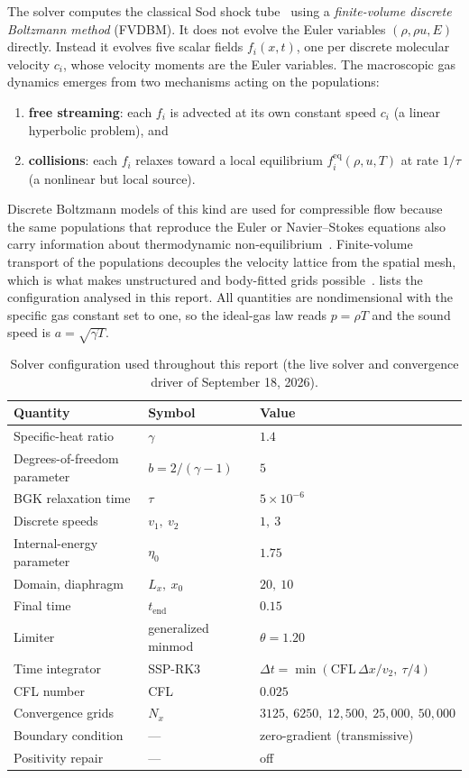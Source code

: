 \documentclass[11pt]{article}
\theoremstyle{remark}
\newcommand{\feq}{f^{\mathrm{eq}}}
\begin{document}
The solver computes the classical Sod shock tube~\citep{Sod1978} using a
\emph{finite-volume discrete Boltzmann method} (FVDBM).  It does not evolve the Euler
variables $(\rho,\rho u,E)$ directly.  Instead it evolves five scalar fields
$f_i(x,t)$, one per discrete molecular velocity $c_i$, whose velocity moments are
the Euler variables.  The macroscopic gas dynamics emerges from two mechanisms
acting on the populations:
\begin{enumerate}
  \item \textbf{free streaming}: each $f_i$ is advected at its own constant speed
        $c_i$ (a linear hyperbolic problem), and
  \item \textbf{collisions}: each $f_i$ relaxes toward a local equilibrium
        $\feq_i(\rho,u,T)$ at rate $1/\tau$ (a nonlinear but local source).
\end{enumerate}
Discrete Boltzmann models of this kind are used for compressible flow because the
same populations that reproduce the Euler or Navier--Stokes equations also carry
information about thermodynamic non-equilibrium~\citep{XuZhangZhang2018,Gan2018}.
Finite-volume transport of the populations decouples the velocity lattice from the
spatial mesh, which is what makes unstructured and body-fitted grids
possible~\citep{XuChenCai2021}.
 lists the configuration analysed in this report.
All quantities are nondimensional with the specific gas constant set to one, so
the ideal-gas law reads $p=\rho T$ and the sound speed is $a=\sqrt{\gamma T}$.

\begin{table}[ht]
\centering
\caption{Solver configuration used throughout this report (the live solver and
convergence driver of September 18, 2026).}
\label{tab:config}
\small
\begin{tabular}{@{}lll@{}}
\toprule
Quantity & Symbol & Value \\
\midrule
Specific-heat ratio & $\gamma$ & $1.4$ \\
Degrees-of-freedom parameter & $b = 2/(\gamma-1)$ & $5$ \\
BGK relaxation time & $\tau$ & $5\times10^{-6}$ \\
Discrete speeds & $v_1,\ v_2$ & $1,\ 3$ \\
Internal-energy parameter & $\eta_0$ & $1.75$ \\
Domain, diaphragm & $L_x,\ x_0$ & $20,\ 10$ \\
Final time & $t_{\mathrm{end}}$ & $0.15$ \\
Limiter & generalized minmod & $\theta = 1.20$ \\
Time integrator & SSP-RK3 & $\Delta t=\min(\mathrm{CFL}\,\Delta x/v_2,\ \tau/4)$ \\
CFL number & CFL & $0.025$ \\
Convergence grids & $N_x$ & $3125,\ 6250,\ 12{,}500,\ 25{,}000,\ 50{,}000$ \\
Boundary condition & --- & zero-gradient (transmissive) \\
Positivity repair & --- & off \\
\bottomrule
\end{tabular}
\end{table}
\end{document}
